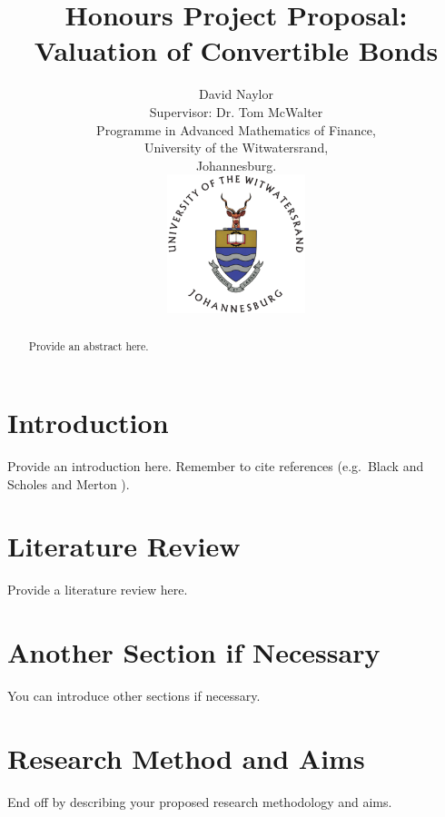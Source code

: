 \documentclass[a4paper,11pt,oneside]{article}
\title{Honours Project Proposal:\\
Valuation of Convertible Bonds}
\author{David Naylor\\[1cm]
Supervisor: Dr. Tom McWalter\\[3cm]
Programme in Advanced Mathematics of Finance,\\
University of the Witwatersrand,\\
Johannesburg.\\[2cm]
\includegraphics[width=4cm]{../common/WitsColourLogo}\\[2cm]
}
\newcommand{\setlinespacing}[1]
           {\renewcommand{\baselinestretch}{#1}\small\normalsize}
\begin{document}
\maketitle
\thispagestyle{empty}

\setlinespacing{1.20}
\newpage

\setcounter{page}{1}


\def\abstractname{\Large Abstract}
\begin{abstract}
Provide an abstract here.
\end{abstract}



\section{Introduction}

Provide an introduction here. Remember to cite references (e.g.~Black
and Scholes \cite{BS73} and Merton \cite{Me73,Me90}).

\section{Literature Review}

Provide a literature review here.

\section{Another Section if Necessary}

You can introduce other sections if necessary.

\section{Research Method and Aims}

End off by describing your proposed research methodology and aims.


\clearpage
\setlinespacing{1}


\end{document}
